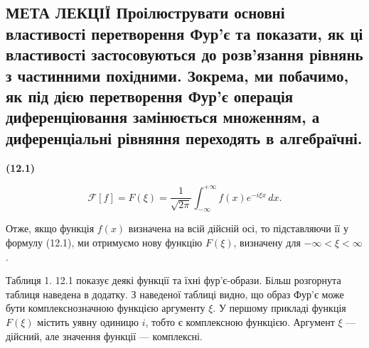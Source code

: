 \documentclass[
  ukrainian,
]{article}
\begin{document}
\subsection{МЕТА ЛЕКЦІЇ Проілюструвати основні властивості перетворення
Фур'є та показати, як ці властивості застосовуються до розв'язання
рівнянь з частинними похідними. Зокрема, ми побачимо, як під дією
перетворення Фур'є операція диференціювання замінюється множенням, а
диференціальні рівняння переходять в
алгебраїчні.}\label{ux43cux435ux442ux430-ux43bux435ux43aux446ux456ux457-ux43fux440ux43eux456ux43bux44eux441ux442ux440ux443ux432ux430ux442ux438-ux43eux441ux43dux43eux432ux43dux456-ux432ux43bux430ux441ux442ux438ux432ux43eux441ux442ux456-ux43fux435ux440ux435ux442ux432ux43eux440ux435ux43dux43dux44f-ux444ux443ux440ux454-ux442ux430-ux43fux43eux43aux430ux437ux430ux442ux438-ux44fux43a-ux446ux456-ux432ux43bux430ux441ux442ux438ux432ux43eux441ux442ux456-ux437ux430ux441ux442ux43eux441ux43eux432ux443ux44eux442ux44cux441ux44f-ux434ux43e-ux440ux43eux437ux432ux44fux437ux430ux43dux43dux44f-ux440ux456ux432ux43dux44fux43dux44c-ux437-ux447ux430ux441ux442ux438ux43dux43dux438ux43cux438-ux43fux43eux445ux456ux434ux43dux438ux43cux438.-ux437ux43eux43aux440ux435ux43cux430-ux43cux438-ux43fux43eux431ux430ux447ux438ux43cux43e-ux44fux43a-ux43fux456ux434-ux434ux456ux454ux44e-ux43fux435ux440ux435ux442ux432ux43eux440ux435ux43dux43dux44f-ux444ux443ux440ux454-ux43eux43fux435ux440ux430ux446ux456ux44f-ux434ux438ux444ux435ux440ux435ux43dux446ux456ux44eux432ux430ux43dux43dux44f-ux437ux430ux43cux456ux43dux44eux454ux442ux44cux441ux44f-ux43cux43dux43eux436ux435ux43dux43dux44fux43c-ux430-ux434ux438ux444ux435ux440ux435ux43dux446ux456ux430ux43bux44cux43dux456-ux440ux456ux432ux43dux44fux43dux43dux44f-ux43fux435ux440ux435ux445ux43eux434ux44fux442ux44c-ux432-ux430ux43bux433ux435ux431ux440ux430ux457ux447ux43dux456.}

\textbf{(12.1)}

\[
\mathcal{F}[f] = F(\xi) = \frac{1}{\sqrt{2\pi}} \int_{-\infty}^{+\infty} f(x)e^{-i\xi x}\,dx.
\]

Отже, якщо функція \(f(x)\) визначена на всій дійсній осі, то
підставляючи її у формулу (12.1), ми отримуємо нову функцію \(F(\xi)\),
визначену для \(-\infty < \xi < \infty\).

Таблиця 1. 12.1 показує деякі функції та їхні фур'є-образи. Більш
розгорнута таблиця наведена в додатку. З наведеної таблиці видно, що
образ Фур'є може бути комплекснозначною функцією аргументу \(\xi\). У
першому прикладі функція \(F(\xi)\) містить уявну одиницю \(i\), тобто є
комплексною функцією. Аргумент \(\xi\) --- дійсний, але значення функції
--- комплексні.
\end{document}
